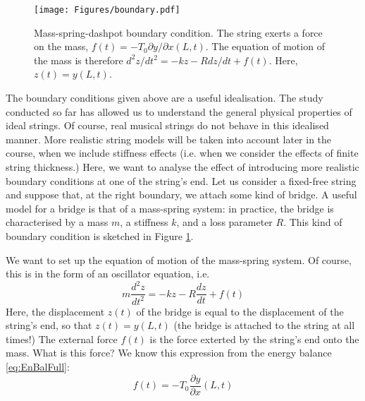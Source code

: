\begin{figure}
\texttt{[image: Figures/boundary.pdf]}
\caption{Mass-spring-dashpot boundary condition. The string exerts a force on the mass, $f(t) = -T_0 \partial y / \partial x (L,t)$. The equation of motion of the mass is therefore $d^2 z / dt^2 = -kz -R dz/dt + f(t)$. Here, $z(t) = y(L,t)$.}\label{fig:impBc}
\end{figure}

The boundary conditions given above are a useful idealisation. The study conducted so far has allowed us to understand the general physical properties of ideal strings. Of course, real musical strings do not behave in this idealised manner. More realistic string models will be taken into account later in the course, when  we include stiffness effects (i.e. when we consider the effects of finite string thickness.) Here, we want to analyse the effect of introducing more realistic boundary conditions at one of the string's end. Let us consider a fixed-free string and suppose that, at the right boundary, we attach some kind of bridge. A useful model for a bridge is that of a mass-spring system: in practice, the bridge is characterised by a mass $m$, a stiffness $k$, and a loss parameter $R$. This kind of boundary condition is sketched in Figure \ref{fig:impBc}.




\medskip \medskip 
\noindent 
We want to set up the equation of motion of the mass-spring system. Of course, this is in the form of an oscillator equation, i.e. 
\begin{equation}\label{eq:ImpBSc}
m \frac{d^2 z}{dt^2} = - k z - R \frac{d z}{dt} + f(t)
\end{equation}
Here, the displacement $z(t)$ of the bridge is equal to the displacement of the string's end, so that $z(t) = y(L,t)$ (the bridge is attached to the string at all times!)
The external force $f(t)$ is the force exterted by the string's end onto the mass. What is this force? We know this expression from the energy balance \eqref{eq:EnBalFull}: 
\begin{equation}\label{eq:ft}
f(t) = - T_0 \frac{\partial y}{\partial x}(L,t)
\end{equation}



